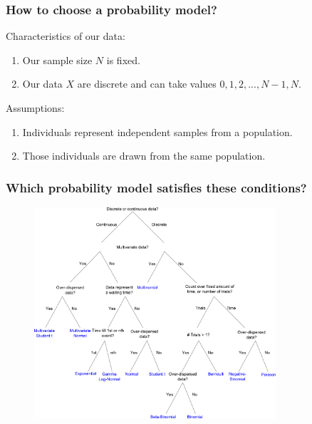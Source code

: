 \documentclass[handout]{beamer}
\begin{document}
\begin{frame}
	\frametitle{How to choose a probability model?}
	
	Characteristics of our data:
	
	\begin{enumerate}
		\item Our sample size $N$ is fixed.
		\item Our data $X$ are discrete and can take values $0, 1, 2, ..., N-1, N$.
	\end{enumerate}
	
	Assumptions:
	
	\begin{enumerate}
		\item Individuals represent independent samples from a population.
		\item Those individuals are drawn from the same population.
	\end{enumerate}
	
\end{frame}

\begin{frame}
	\frametitle{Which probability model satisfies these conditions?}
	\begin{figure}[h]
		\centerline{\includegraphics[width=0.8\textwidth]{figures/Distributions_likelihoodTree.pdf}}
	\end{figure}
	
\end{frame}
\end{document}
